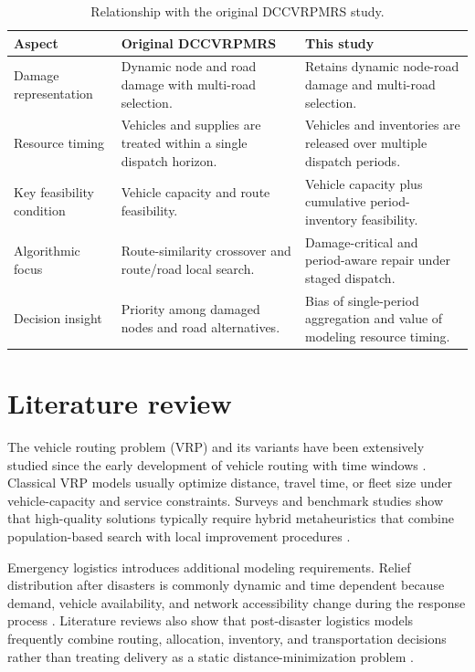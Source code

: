 ﻿\documentclass[preprint,12pt,authoryear]{elsarticle}
\begin{document}
\begin{table}[H]
\centering
\caption{Relationship with the original DCCVRPMRS study.}
\label{tab:relation-original}
\scriptsize
\begin{tabularx}{\textwidth}{>{\raggedright\arraybackslash}p{}>{\raggedright\arraybackslash}X>{\raggedright\arraybackslash}X}
\toprule
Aspect & Original DCCVRPMRS \citep{zhao2026routing} & This study \\
\midrule
Damage representation & Dynamic node and road damage with multi-road selection. & Retains dynamic node-road damage and multi-road selection. \\
Resource timing & Vehicles and supplies are treated within a single dispatch horizon. & Vehicles and inventories are released over multiple dispatch periods. \\
Key feasibility condition & Vehicle capacity and route feasibility. & Vehicle capacity plus cumulative period-inventory feasibility. \\
Algorithmic focus & Route-similarity crossover and route/road local search. & Damage-critical and period-aware repair under staged dispatch. \\
Decision insight & Priority among damaged nodes and road alternatives. & Bias of single-period aggregation and value of modeling resource timing. \\
\bottomrule
\end{tabularx}
\end{table}

\section{Literature review}
\label{sec:literature}

The vehicle routing problem (VRP) and its variants have been extensively studied since the early development of vehicle routing with time windows \citep{solomon1987algorithms}. Classical VRP models usually optimize distance, travel time, or fleet size under vehicle-capacity and service constraints. Surveys and benchmark studies show that high-quality solutions typically require hybrid metaheuristics that combine population-based search with local improvement procedures \citep{braysy2005vehicle, pisinger2007general, vidal2013hybrid}.

Emergency logistics introduces additional modeling requirements. Relief distribution after disasters is commonly dynamic and time dependent because demand, vehicle availability, and network accessibility change during the response process \citep{ozdamar2004emergency, sheu2007emergency}. Literature reviews also show that post-disaster logistics models frequently combine routing, allocation, inventory, and transportation decisions rather than treating delivery as a static distance-minimization problem \citep{caunhye2012optimization, afshar2012modeling}.
\end{document}

